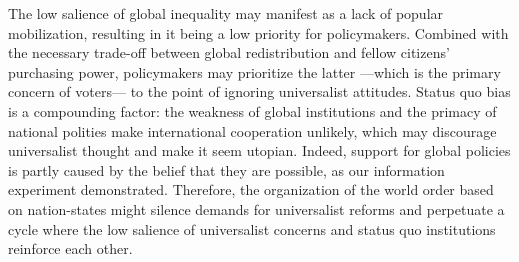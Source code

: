 \documentclass[12pt,english]{article}
\begin{document}
\begin{bibunit}
The low salience of global inequality may manifest as a lack of popular mobilization, resulting in it being a low priority for policymakers. Combined with the necessary trade-off between global redistribution and fellow citizens' purchasing power, policymakers may prioritize the latter ---which is the primary concern of voters--- to the point of ignoring universalist attitudes. 
Status quo bias is a compounding factor: the weakness of global institutions and the primacy of national polities make international cooperation unlikely, %
which may discourage universalist thought and make it seem utopian. %
Indeed, support for global policies is partly caused by the belief that they are possible, as our information experiment demonstrated. Therefore, the organization of the %
world order based on nation-states might silence demands for %
universalist reforms and perpetuate a cycle where the low salience of universalist concerns and status quo institutions reinforce each other. 


\end{bibunit}
\end{document}
